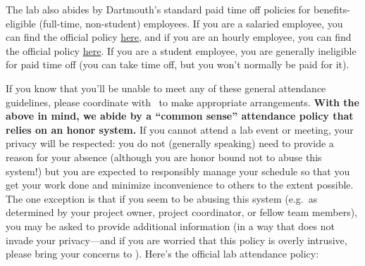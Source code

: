 \documentclass{tufte-book} %
\begin{document}
 The lab also abides by Dartmouth's standard paid time off policies
 for benefits-eligible (full-time, non-student) employees.  If you are
 a salaried employee, you can find the official policy
 \href{http://www.dartmouth.edu/~hrs/pdfs/paid_time_off_salaried.pdf}{here},
 and if you are an hourly employee, you can find the official policy
 \href{http://www.dartmouth.edu/~hrs/pdfs/Paid_Time_Off_Hourly.pdf}{here}.
 If you are a student employee, you are generally ineligible for paid
 time off (you can take time off, but you won't normally be paid for
 it).

 If you know that you'll be unable to meet any of these general
 attendance guidelines, please coordinate with \director~to make
 appropriate arrangements.  \textbf{With the above in mind, we abide
   by a ``common sense'' attendance policy that relies on an honor
   system.}  If you
 cannot attend a lab event or meeting, your privacy will be respected:
 you do not (generally speaking) need to provide a reason for your
 absence (although you are honor bound not to abuse this system!) but
 you are expected to responsibly manage your schedule so that you get
 your work done and minimize inconvenience to others to the extent
 possible.  The one exception is that if you seem to be abusing this
 system (e.g.\ as determined by your project owner, project
 coordinator, or fellow team members), you may be asked to provide
 additional information (in a way that does not invade your
 privacy---and if you are worried that this policy is overly
 intrusive, please bring your concerns to \director).  Here's the
 official lab attendance policy:
\end{document}
